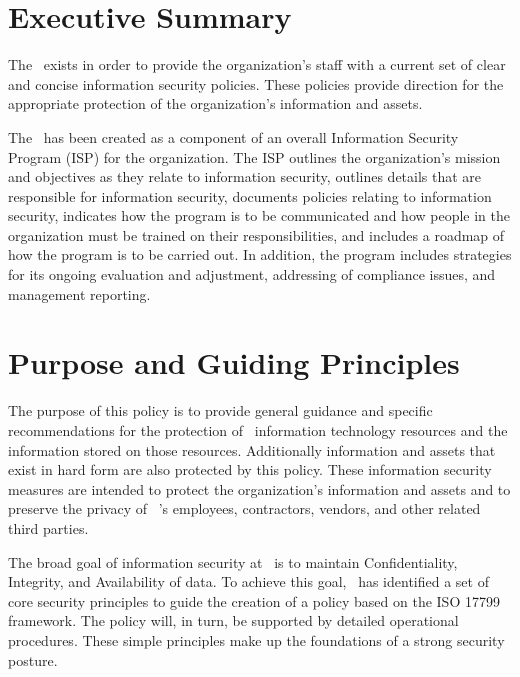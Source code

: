 \documentclass[sec]{policy}
\begin{document}
	\maketitle

	\thispagestyle{plain}
	\titleline
	
	\doctable
	\tableofcontents
	
	\section{Executive Summary}
	
		The \thetitle\ exists in order to provide the organization’s staff with a current set of clear and concise information security policies.  These policies provide direction for the appropriate protection of the organization’s information and assets.
	
		The \thetitle\ has been created as a component of an overall Information Security Program (ISP) for the organization.  The ISP outlines the organization’s mission and objectives as they relate to information security, outlines details that are responsible for information security, documents policies relating to information security, indicates how the program is to be communicated and how people in the organization must be trained on their responsibilities, and includes a roadmap of how the program is to be carried out.  In addition, the program includes strategies for its ongoing evaluation and adjustment, addressing of compliance issues, and management reporting.
		
	\section{Purpose and Guiding Principles}
		
		The purpose of this policy is to provide general guidance and specific recommendations for the protection of \theOrganization\ information technology resources and the information stored on those resources.  Additionally information and assets that exist in hard form are also protected by this policy.  These information security measures are intended to protect the organization’s information and assets and to preserve the privacy of \theOrganization\ ’s employees, contractors, vendors, and other related third parties.
		
		The broad goal of information security at \theOrganization\ is to maintain Confidentiality, Integrity, and Availability of data.  To achieve this goal, \theOrganization\ has identified a set of core security principles to guide the creation of a policy based on the ISO 17799 framework.  The policy will, in turn, be supported by detailed operational procedures.  These simple principles make up the foundations of a strong security posture.
		
\end{document}
